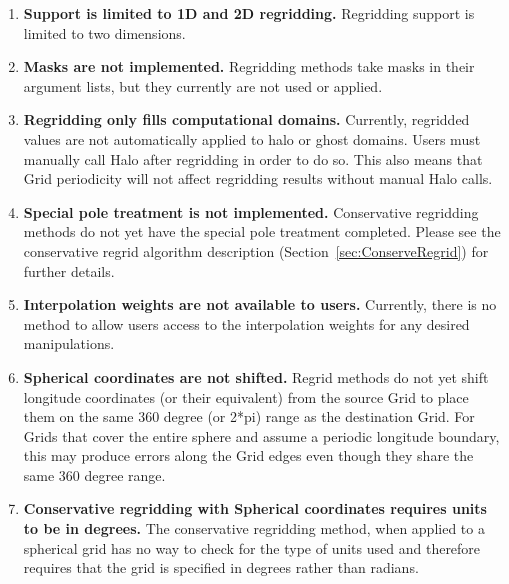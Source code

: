 

\begin{enumerate}

\item {\bf Support is limited to 1D and 2D regridding.}  Regridding
support is limited to two dimensions.

\item {\bf Masks are not implemented.}  Regridding methods take
masks in their argument lists, but they currently are not used or
applied.

\item {\bf Regridding only fills computational domains.}  Currently,
regridded values are not automatically applied to halo or ghost
domains.  Users must manually call Halo after regridding in order
to do so.  This also means that Grid periodicity will not affect
regridding results without manual Halo calls.

\item {\bf Special pole treatment is not implemented.}
Conservative regridding methods do not yet have the special pole
treatment completed.  Please see the conservative regrid algorithm
description (Section~\ref{sec:ConserveRegrid}) for further details.

\item {\bf Interpolation weights are not available to users.}  
Currently, there is no method to allow users access to the interpolation
weights for any desired manipulations.

\item {\bf Spherical coordinates are not shifted.}
Regrid methods do not yet shift longitude coordinates
(or their equivalent) from the source Grid to place them on the same
360 degree (or 2*pi) range as the destination Grid.  For Grids that
cover the entire sphere and assume a periodic longitude boundary,
this may produce errors along the Grid edges even though they share
the same 360 degree range.

\item {\bf Conservative regridding with Spherical coordinates requires 
units to be in degrees.} The conservative regridding method, when applied to 
a spherical grid has no way to check for the type of units used and therefore
requires that the grid is specified in degrees rather than radians. 


\end{enumerate}
